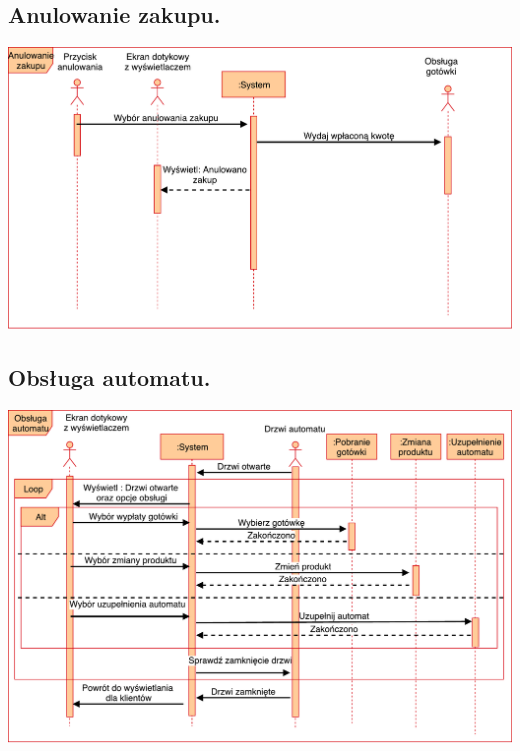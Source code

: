 \documentclass[11pt]{article}
\begin{document}
		\subsection{Anulowanie zakupu.}
		\begin{center}
			\includegraphics[scale=0.65]{AnulowanieZakupu.pdf}
		\end{center}
		\newpage
		\subsection{Obsługa automatu.}
		\begin{center}
			\includegraphics[scale=0.65]{ObslugaAutomatu.pdf}
		\end{center}
		\newpage
\end{document}

